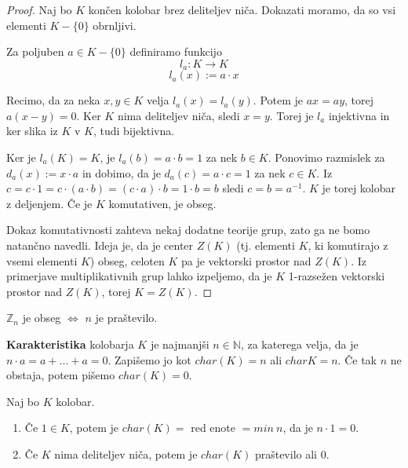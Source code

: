 \documentclass[11pt, a4paper]{article}
\begin{document}
    \begin{proof}
        Naj bo \(K\) končen kolobar brez deliteljev niča. Dokazati moramo, da so vsi elementi \(K - \{0\}\) obrnljivi.
        \par
        Za poljuben \(a \in K - \{0\}\) definiramo funkcijo
        \[l_a: K \rightarrow K\] 
        \[l_a(x) := a \cdot x\]
        \par
        Recimo, da za neka \(x,y \in K\) velja \(l_a(x) = l_a(y)\). Potem je \(ax = ay\), torej \(a(x-y) = 0\). Ker \(K\) nima deliteljev niča, sledi \(x = y\). Torej je \(l_a\) injektivna in ker slika iz \(K\) v \(K\), tudi bijektivna.
        \par
        Ker je \(l_a(K) = K\), je \(l_a(b) = a \cdot b = 1\) za nek \(b \in K\). Ponovimo razmislek za \(d_a (x):= x \cdot a\) in dobimo, da je \(d_a(c) = a \cdot c = 1\) za nek \(c \in K\). Iz \(c = c \cdot 1 = c \cdot (a \cdot b) = (c \cdot a) \cdot b = 1 \cdot b = b\) sledi \(c = b = a^{-1}\). \(K\) je torej kolobar z deljenjem. Če je \(K\) komutativen, je obseg.
        \par
        Dokaz komutativnosti zahteva nekaj dodatne teorije grup, zato ga ne bomo natančno navedli. Ideja je, da je center \(Z(K)\) (tj. elementi \(K\), ki komutirajo z vsemi elementi \(K\)) obseg, celoten \(K\) pa je vektorski prostor nad \(Z(K)\). Iz primerjave multiplikativnih grup lahko izpeljemo, da je \(K\) 1-razsežen vektorski prostor nad \(Z(K)\), torej \(K = Z(K)\).
    \end{proof}

    \begin{corollary}
        \(\mathbb{Z}_n\) je obseg \(\Leftrightarrow\) \(n\) je praštevilo.
    \end{corollary}

    \begin{definition}
        \textbf{Karakteristika} kolobarja \(K\) je najmanjši \(n \in \mathbb{N}\), za katerega velja, da je \(n \cdot a = a+...+a=0\). Zapišemo jo kot \(char(K)=n\) ali \(char K = n\). Če tak \(n\) ne obstaja, potem pišemo \(char(K) = 0\).
    \end{definition}

    \begin{proposition}
        Naj bo \(K\) kolobar.
        \begin{enumerate}[label=\alph*)]
            \item Če \(1 \in K\), potem je \(char(K) = \) red enote \(= min\ n\), da je \(n \cdot 1 = 0\).
            \item Če \(K\) nima deliteljev niča, potem je \(char(K)\) praštevilo ali \(0\). 
        \end{enumerate}
    \end{proposition}
\end{document}
